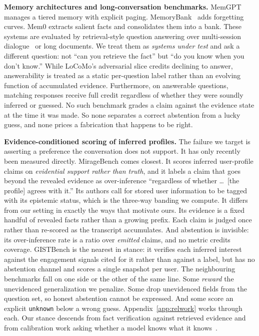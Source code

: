 \documentclass{article}
\begin{document}
\textbf{Memory architectures and long-conversation benchmarks.} MemGPT~\citep{packer2023memgpt}
manages a tiered memory with explicit paging. MemoryBank~\citep{zhong2024memorybank} adds forgetting
curves. Mem0 \citep{chhikara2025mem0} extracts salient facts and consolidates them into a bank. These
systems are evaluated by retrieval-style question answering over multi-session
dialogue~\citep{maharana2024locomo, xu2022msc} or long documents. We treat them as \emph{systems
under test} and ask a different question: not ``can you retrieve the fact'' but ``do you know when
you don't know.'' While LoCoMo's adversarial slice credits declining to answer, answerability is treated as a static
per-question label rather than an evolving function of accumulated evidence. Furthermore, on
answerable questions, matching responses receive full credit regardless of whether they were soundly
inferred or guessed. No such benchmark
grades a claim against the evidence state at the time it was made. So none separates a correct
abstention from a lucky guess, and none prices a fabrication that happens to be right.

\textbf{Evidence-conditioned scoring of inferred profiles.} The failure we target is asserting a
preference the conversation does not support. It has only recently been measured directly.
MirageBench \citep{sun2026miragebench} comes closest. It scores inferred user-profile claims on
\emph{evidential support rather than truth}, and it labels a claim that goes beyond the revealed
evidence as over-inference ``regardless of whether \dots\ [the profile] agrees with it.'' Its authors
call for stored user information to be tagged with its epistemic status, which is the three-way
banding we compute. It differs from our setting in exactly the ways that motivate ours. Its evidence
is a fixed handful of revealed facts rather than a growing prefix. Each claim is judged once rather
than re-scored as the transcript accumulates. And abstention is invisible: its over-inference rate is
a ratio over \emph{emitted} claims, and no metric credits coverage. GISTBench
\citep{fostiropoulos2026gistbench} is the nearest in stance: it verifies each inferred interest
against the engagement signals cited for it rather than against a label, but has no abstention
channel and scores a single snapshot per user. The neighbouring benchmarks fall on one side or the
other of the same line. Some \emph{reward} the unevidenced generalization we penalize. Some drop
unevidenced fields from the question set, so honest abstention cannot be expressed. And some score an
explicit \texttt{unknown} below a wrong guess. Appendix~\ref{app:relwork} works through each.
Our stance descends from fact verification against retrieved evidence \citep{thorne2018fever} and
from calibration work asking whether a model knows what it knows~\citep{kadavath2022know}.
\end{document}
